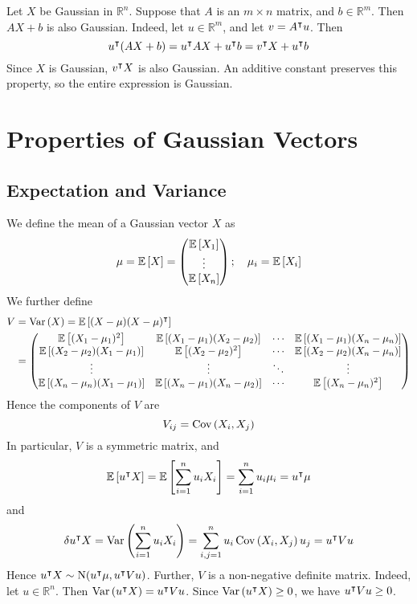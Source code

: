 \documentclass{article}
\begin{document}
Let $X$ be Gaussian in $\mathbb R^n$. Suppose that $A$ is an $m \times n$ matrix, and $b \in \mathbb R^m$. Then $AX + b$ is also Gaussian. Indeed, let $u \in \mathbb R^m$, and let $v = A^\intercal u$. Then
\[ u^\intercal(AX + b) = u^\intercal AX + u^\intercal b = v^\intercal X + u^\intercal b \]
Since $X$ is Gaussian, $v^\intercal X$ is also Gaussian. An additive constant preserves this property, so the entire expression is Gaussian.

\section{Properties of Gaussian Vectors}
\subsection{Expectation and Variance}
We define the mean of a Gaussian vector $X$ as
\[ \mu = \mathbb{E}\left[{X}\right] = \begin{pmatrix}
		\mathbb{E}\left[{X_1}\right] \\ \vdots \\ \mathbb{E}\left[{X_n}\right]
	\end{pmatrix};\quad \mu_i = \mathbb{E}\left[{X_i}\right] \]
We further define
\begin{align*}
	V & = \operatorname{Var}\left({X}\right) = \mathbb{E}\left[{(X - \mu) (X - \mu)^\intercal}\right] \\
	  & = \begin{pmatrix}
		\mathbb{E}\left[{(X_1 - \mu_1)^2}\right]            & \mathbb{E}\left[{(X_1 - \mu_1)(X_2 - \mu_2)}\right] & \cdots & \mathbb{E}\left[{(X_1 - \mu_1)(X_n - \mu_n)}\right] \\
		\mathbb{E}\left[{(X_2 - \mu_2)(X_1 - \mu_1)}\right] & \mathbb{E}\left[{(X_2 - \mu_2)^2}\right]            & \cdots & \mathbb{E}\left[{(X_2 - \mu_2)(X_n - \mu_n)}\right] \\
		\vdots                              & \vdots                              & \ddots & \vdots                              \\
		\mathbb{E}\left[{(X_n - \mu_n)(X_1 - \mu_1)}\right] & \mathbb{E}\left[{(X_n - \mu_1)(X_n - \mu_2)}\right] & \cdots & \mathbb{E}\left[{(X_n - \mu_n)^2}\right]
	\end{pmatrix}
\end{align*}
Hence the components of $V$ are
\[ V_{ij} = \operatorname{Cov}\left({X_i, X_j}\right) \]
In particular, $V$ is a symmetric matrix, and
\[ \mathbb{E}\left[{u^\intercal X}\right] = \mathbb{E}\left[{\sum_{i=1}^n u_i X_i}\right] = \sum_{i=1}^n u_i \mu_i = u^\intercal \mu \]
and
\[ \var{u^\intercal X} = \operatorname{Var}\left({\sum_{i=1}^n u_i X_i}\right) = \sum_{i,j = 1}^n u_i \operatorname{Cov}\left({X_i, X_j}\right) u_j = u^\intercal V u \]
Hence $u^\intercal X \sim \mathrm{N}(u^\intercal \mu, u^\intercal V u)$. Further, $V$ is a non-negative definite matrix. Indeed, let $u \in \mathbb R^n$. Then $\operatorname{Var}\left({u^\intercal X}\right) = u^\intercal V u$. Since $\operatorname{Var}\left({u^\intercal X}\right) \geq 0$, we have $u^\intercal V u \geq 0$.
\end{document}
